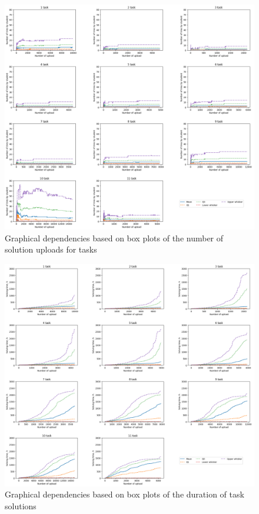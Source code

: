 \documentclass{article}
\begin{document}
  \begin{figure}[h]
    \centering
    \includegraphics[width=\linewidth]{pic1.png}
    \caption{Graphical dependencies based on box plots of the number of solution uploads for tasks}
    \label{fig:pic1}
  \end{figure}
  \begin{figure}[h]
    \centering
    \includegraphics[width=\linewidth]{pic2.png}
    \caption{Graphical dependencies based on box plots of the duration of task solutions}
    \label{fig:pic2}
  \end{figure}
\end{document}
